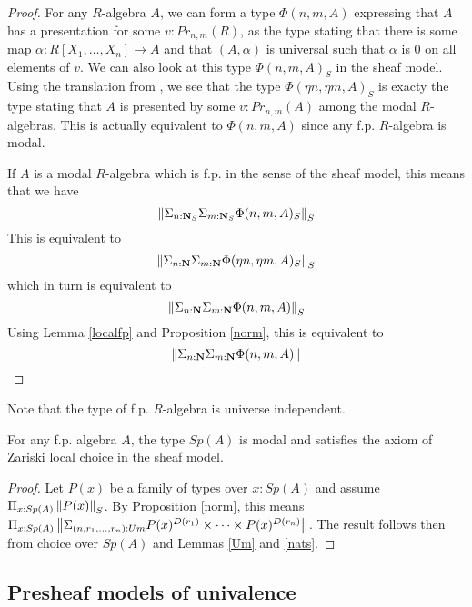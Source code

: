     \begin{proof}
          For any $R$-algebra $A$, we can form a type $\Phi(n,m,A)$ expressing that $A$ has a presentation for some $v:Pr_{n,m}(R)$,
    as the type stating that there is some map $\alpha:R[X_1,\dots,X_n]\rightarrow A$ and that $(A,\alpha)$ is universal such that
    $\alpha$ is $0$ on all elements of $v$. We can also look at this type $\Phi(n,m,A)_S$ in the sheaf model. Using the translation
    from \cite{Quirin16,CRS21}, we see that the type $\Phi(\eta n,\eta m,A)_S$ is exacty the type stating that $A$ is presented by
    some $v:Pr_{n,m}(A)$ among the modal $R$-algebras. This is actually equivalent to $\Phi(n,m,A)$ since any f.p. $R$-algebra is modal.

     If $A$ is a modal $R$-algebra which is f.p. in the sense of the sheaf model, this means that we have
     $$\left\lVert \Sigma_{n:\mathbf{N}_S}\Sigma_{m:\mathbf{N}_S}\Phi(n,m,A)_S \right\rVert_S$$
     This is equivalent to
     $$\left\lVert \Sigma_{n:\mathbf{N}}\Sigma_{m:\mathbf{N}}\Phi(\eta n,\eta m,A)_S \right\rVert_S$$
     which in turn is equivalent to
     $$\left\lVert \Sigma_{n:\mathbf{N}}\Sigma_{m:\mathbf{N}}\Phi(n,m,A) \right\rVert_S$$
     Using Lemma \ref{localfp} and Proposition \ref{norm}, this is equivalent to
     $$\left\lVert \Sigma_{n:\mathbf{N}}\Sigma_{m:\mathbf{N}}\Phi(n,m,A) \right\rVert$$     
    \end{proof}

     Note that the type of f.p. $R$-algebra is universe independent.

    \begin{proposition}
      For any f.p. algebra $A$, the type $Sp(A)$ is modal and satisfies the axiom of Zariski local choice in
      the sheaf model.
    \end{proposition}
    
    \begin{proof}
      Let $P(x)$ be a family of types over $x:Sp(A)$ and assume $\Pi_{x:Sp(A)}\left\lVert P(x) \right\rVert_S$. By Proposition \ref{norm},
      this means $\Pi_{x:Sp(A)}\left\lVert \Sigma_{(n,r_1,\dots,r_n):Um}P(x)^{D(r_1)}\times\dots\times P(x)^{D(r_n)} \right\rVert$. The result follows
      then from choice over $Sp(A)$ and Lemmas \ref{Um} and \ref{nats}.
    \end{proof}      


    \subsection{Presheaf models of univalence}

